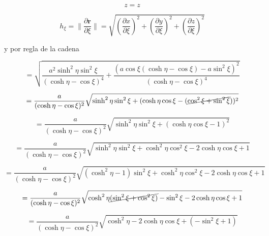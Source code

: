 \documentclass[12pt,a4paper]{article}
\providecommand{\norm}[1]{\lVert#1\rVert}
\begin{document}
\begin{enumerate}
    \begin{equation*}
        z = z
    \end{equation*}
    
    \begin{equation*}
        h_\xi = \norm{\frac{\partial \mathbf{r}}{\partial \xi}} = \sqrt{\left(\frac{\partial x}{\partial \xi}\right)^2 + \left(\frac{\partial y}{\partial \xi}\right)^2 + \left(\frac{\partial z}{\partial \xi}\right)^2} 
    \end{equation*}
    
    y por regla de la cadena
    
    \begin{equation*}
        = \sqrt{\frac{a^2\sinh^2{\eta} \sin^2{\xi}}{(\cosh{\eta}- \cos{\xi})^4}+ \frac{(a \cos{\xi}(\cosh{\eta}- \cos{\xi})- a\sin^2{\xi})^2}{(\cosh{\eta}- \cos{\xi})^4}}
    \end{equation*}
    
    \begin{equation*}
        = \frac{a}{(\cosh{\eta}- \cos{\xi})^2} \sqrt{\sinh^2{\eta}\sin^2{\xi}+(\cosh{\eta}\cos{\xi}-(\cancel{\cos^2{\xi}+ \sin^2{\xi}}))^2}
    \end{equation*}
    
    \begin{equation*}
        = \frac{a}{(\cosh{\eta}- \cos{\xi})^2} \sqrt{\sinh^2{\eta}\sin^2{\xi}+(\cosh{\eta}\cos{\xi}-1)^2}
    \end{equation*}
    
    \begin{equation*}
        = \frac{a}{(\cosh{\eta}- \cos{\xi})^2} \sqrt{\sinh^2{\eta}\sin^2{\xi}+\cosh^2{\eta}\cos^2{\xi}-2\cosh{\eta}\cos{\xi}+1}
    \end{equation*}
    
    \begin{equation*}
        = \frac{a}{(\cosh{\eta}- \cos{\xi})^2} \sqrt{(\cosh^2{\eta}-1)\sin^2{\xi}+\cosh^2{\eta}\cos^2{\xi}-2\cosh{\eta}\cos{\xi}+1}
    \end{equation*}
    
    \begin{equation*}
        = \frac{a}{(\cosh{\eta}- \cos{\xi})^2} \sqrt{\cosh^2{\eta}\cancel{(\sin^2{\xi}+\cos^2{\xi})} -\sin^2{\xi}-2\cosh{\eta}\cos{\xi}+1}
    \end{equation*}
    
    \begin{equation*}
        = \frac{a}{(\cosh{\eta}- \cos{\xi})^2} \sqrt{\cosh^2{\eta}-2\cosh{\eta}\cos{\xi}+ (-\sin^2{\xi}+1)}
    \end{equation*}
    

\end{enumerate}
\end{document}
